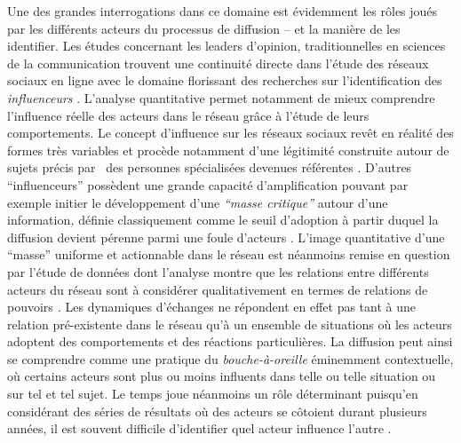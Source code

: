 Une des grandes interrogations dans ce domaine est \'evidemment les
r\^oles jou\'es par les diff\'erents acteurs du processus de diffusion
-- et la mani\`ere de les identifier. Les \'etudes concernant les
leaders d{\textquoteright}opinion, traditionnelles en sciences de la
communication \cite{Katz1955} trouvent une continuit\'e
directe dans l{\textquoteright}\'etude des r\'eseaux sociaux en ligne
avec le domaine florissant des recherches sur
l{\textquoteright}identification des \textit{influenceurs} \cite{Bakshy2011, Leavitt2009}. L{\textquoteright}analyse quantitative permet notamment de mieux
comprendre l{\textquoteright}influence r\'eelle des acteurs dans le
r\'eseau gr\^ace \`a l{\textquoteright}\'etude de leurs comportements.
Le concept d{\textquoteright}influence sur les r\'eseaux sociaux
rev\^et en r\'ealit\'e des formes tr\`es variables et proc\`ede
notamment d{\textquoteright}une l\'egitimit\'e construite autour de
sujets pr\'ecis par \ des personnes sp\'ecialis\'ees devenues
r\'ef\'erentes \cite{Cha2010}. D{\textquoteright}autres
{\textquotedblleft}influenceurs{\textquotedblright} poss\`edent une
grande capacit\'e d{\textquoteright}amplification pouvant par exemple
initier le d\'eveloppement d{\textquoteright}une
\textit{{\textquotedblleft}masse critique{\textquotedblright} }autour
d{\textquoteright}une information\textit{, }d\'efinie classiquement
comme le seuil d{\textquoteright}adoption \`a partir duquel la
diffusion devient p\'erenne parmi une foule d{\textquoteright}acteurs
\cite{Oliver2001}. L{\textquoteright}image quantitative
d{\textquoteright}une {\textquotedblleft}masse{\textquotedblright}
uniforme et actionnable dans le r\'eseau est n\'eanmoins remise en
question par l{\textquoteright}\'etude de donn\'ees dont
l{\textquoteright}analyse montre que les relations entre diff\'erents
acteurs du r\'eseau sont \`a consid\'erer qualitativement en termes de
relations de pouvoirs \cite{Steyer2006}\textit{. }Les dynamiques
d{\textquoteright}\'echanges ne r\'epondent en effet pas tant \`a une
relation pr\'e-existente dans le r\'eseau qu{\textquoteright}\`a un
ensemble de situations o\`u les acteurs adoptent des comportements et
des r\'eactions particuli\`eres. La diffusion peut ainsi se comprendre
comme une pratique du \textit{bouche-\`a-oreille} \'eminemment
contextuelle, o\`u certains acteurs sont plus ou moins influents dans
telle ou telle situation ou sur tel et tel sujet. Le temps joue
n\'eanmoins un r\^ole d\'eterminant puisqu{\textquoteright}en
consid\'erant des s\'eries de r\'esultats o\`u des acteurs se
c\^otoient durant plusieurs ann\'ees, il est souvent difficile
d{\textquoteright}identifier quel acteur influence
l{\textquoteright}autre \cite{Aral2009}. 

